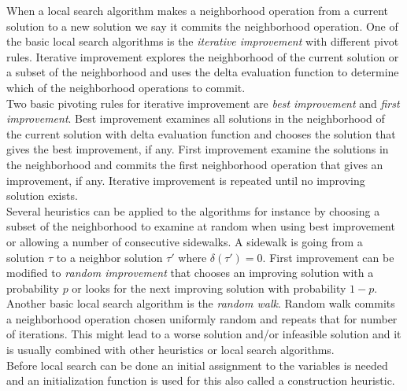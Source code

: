 When a local search algorithm makes a neighborhood operation from a current solution to a new solution we say it 
commits the neighborhood operation. One of the basic local search algorithms is the \emph{iterative 
improvement} with different pivot rules. Iterative improvement explores the neighborhood of the current solution or a 
subset of the neighborhood and uses the delta evaluation function to determine which of the neighborhood operations 
to commit. \\ 
Two basic pivoting rules for iterative improvement are \emph{best improvement} and \emph{first improvement}. Best 
improvement examines all solutions in the neighborhood of the current solution with delta evaluation function and 
chooses the solution that gives the best improvement, if any. First improvement examine the solutions in the 
neighborhood and commits the first neighborhood operation that gives an improvement, if any. Iterative 
improvement is repeated until no improving solution exists. \\ 
Several heuristics can be applied to the algorithms for instance by choosing a subset of the neighborhood to examine at 
random when using best improvement or allowing a number of consecutive sidewalks. A sidewalk is going from a solution 
$\tau$ to a neighbor solution $\tau'$ where $\delta(\tau') = 0$. First improvement can be modified to \emph{random 
improvement} that chooses an improving solution with a probability $p$ or looks for the next improving solution with 
probability $1-p$. \\ 
Another basic local search algorithm is the \emph{random walk}. Random walk commits a neighborhood operation chosen 
uniformly random and repeats that for number of iterations. This might lead to a worse solution and/or infeasible 
solution and it is usually combined with other heuristics or local search algorithms. \\
Before local search can be done an initial assignment to the variables is needed and an initialization function is 
used for this also called a construction heuristic. 